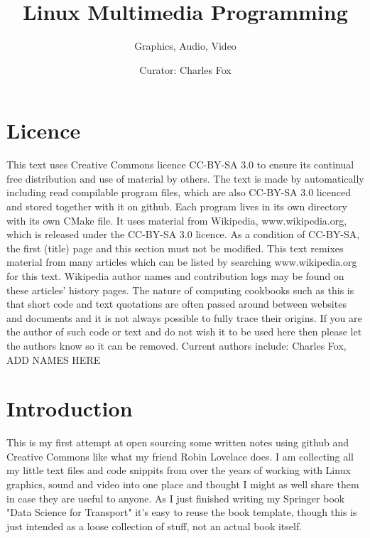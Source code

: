 \documentclass[oneside,english]{scrbook}
\begin{document}
\title{Linux Multimedia Programming}
\author{Graphics, Audio, Video}
\date{Curator: Charles Fox}
\publishers{Licence: CC-BY-SA 3.0}
\maketitle

\chapter*{Licence}

This text uses Creative Commons licence CC-BY-SA 3.0 to ensure its continual free distribution and use of material by others. The text is made by automatically including read compilable program files, which are also CC-BY-SA 3.0 licenced and stored together with it on github. Each program lives in its own directory with its own CMake file.  It uses material from Wikipedia, www.wikipedia.org, which is released under the CC-BY-SA 3.0 licence. As a condition of CC-BY-SA, the first (title) page and this section must not be modified.  This text remixes material from many articles which can be listed by searching www.wikipedia.org for this text.  Wikipedia author names and contribution logs may be found on these articles' history pages.   The nature of computing cookbooks such as this is that short code and text quotations are often passed around between websites and documents and it is not always possible to fully trace their origins. If you are the author of such code or text and do not wish it to be used here then please let the authors know so it can be removed. 
Current authors include: Charles Fox, ADD NAMES HERE

\tableofcontents

\chapter{Introduction}

This is my first attempt at open sourcing some written notes using github and Creative Commons like what my friend Robin Lovelace does. I am collecting all my little text files and code snippits from over the years of working with Linux graphics, sound and video into one place and thought I might as well share them in case they are useful to anyone.  As I just finished writing my Springer book "Data Science for Transport" it's easy to reuse the book template, though this is just intended as a loose collection of stuff, not an actual book itself.
\end{document}
